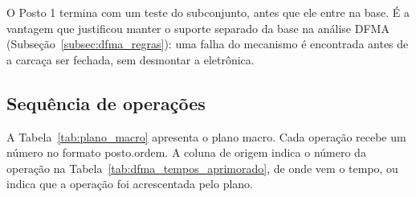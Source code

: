 O Posto 1 termina com um teste do subconjunto, antes que ele entre na base. É a vantagem que justificou manter o suporte separado da base na análise DFMA (Subseção~\ref{subsec:dfma_regras}): uma falha do mecanismo é encontrada antes de a carcaça ser fechada, sem desmontar a eletrônica.

\subsection{Sequência de operações}
\label{subsec:plano_sequencia}

A Tabela~\ref{tab:plano_macro} apresenta o plano macro. Cada operação recebe um número no formato posto.ordem. A coluna de origem indica o número da operação na Tabela~\ref{tab:dfma_tempos_aprimorado}, de onde vem o tempo, ou indica que a operação foi acrescentada pelo plano.

